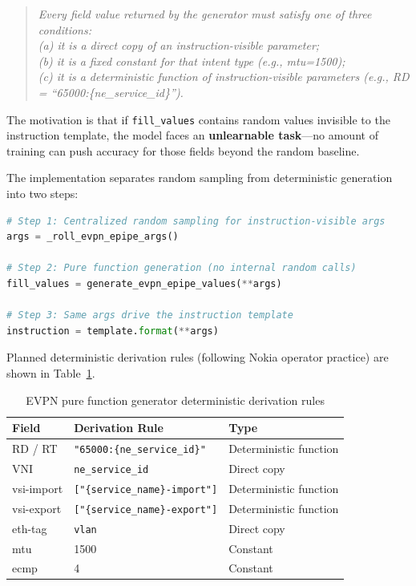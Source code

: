 \documentclass[12pt, a4paper]{article}
\newcommand{\fillvalues}{\texttt{fill\_values}}
\begin{document}
\begin{quote}
\itshape
Every field value returned by the generator must satisfy one of three conditions:\\
(a) it is a direct copy of an instruction-visible parameter;\\
(b) it is a fixed constant for that intent type (e.g., mtu=1500);\\
(c) it is a deterministic function of instruction-visible parameters (e.g., RD = ``65000:\{ne\_service\_id\}'').
\end{quote}

\noindent
The motivation is that if \fillvalues{} contains random values invisible to the instruction template, the model faces an \textbf{unlearnable task}---no amount of training can push accuracy for those fields beyond the random baseline.

The implementation separates random sampling from deterministic generation into two steps:

\begin{lstlisting}[language=Python, caption={Pure function generator: two-step separation}]
# Step 1: Centralized random sampling for instruction-visible args
args = _roll_evpn_epipe_args()

# Step 2: Pure function generation (no internal random calls)
fill_values = generate_evpn_epipe_values(**args)

# Step 3: Same args drive the instruction template
instruction = template.format(**args)
\end{lstlisting}

\noindent
Planned deterministic derivation rules (following Nokia operator practice) are shown in Table~\ref{tab:deterministic-rules}.

\begin{table}[H]
\centering
\caption{EVPN pure function generator deterministic derivation rules}
\label{tab:deterministic-rules}
\small
\begin{tabular}{lll}
\toprule
\textbf{Field} & \textbf{Derivation Rule} & \textbf{Type} \\
\midrule
RD / RT            & \texttt{"65000:\{ne\_service\_id\}"} & Deterministic function \\
VNI                & \texttt{ne\_service\_id}             & Direct copy \\
vsi-import         & \texttt{["\{service\_name\}-import"]} & Deterministic function \\
vsi-export         & \texttt{["\{service\_name\}-export"]} & Deterministic function \\
eth-tag            & \texttt{vlan}                        & Direct copy \\
mtu                & 1500                                  & Constant \\
ecmp               & 4                                     & Constant \\
\bottomrule
\end{tabular}
\end{table}
\end{document}
